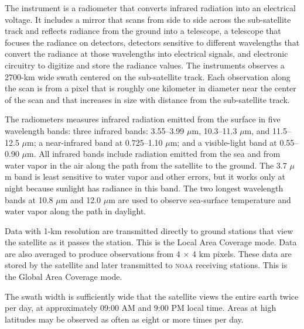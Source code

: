 The instrument is a radiometer that converts infrared radiation into
an electrical voltage. It includes a mirror that scans from side to
side across the sub-satellite track and reflects radiance from the
ground into a telescope, a telescope that focuses the radiance on
detectors, detectors sensitive to different wavelengths that convert
the radiance at those wavelengths into electrical signals, and
electronic circuitry to digitize and store the radiance values. The
instruments observes a 2700-km wide swath centered on the
sub-satellite track. Each observation along the scan is from a pixel
that is roughly one kilometer in diameter near the center of the scan
and that increases in size with distance from the sub-satellite track.

The radiometers measures infrared radiation emitted from the surface
in five wavelength bands: three infrared bands: 3.55--3.99 $\mu$m,
10.3--11.3 $\mu$m, and 11.5--12.5 $\mu$m; a near-infrared band at
0.725--1.10 $\mu$m; and a visible-light band at 0.55--0.90 $\mu$m. All
infrared bands include radiation emitted from the sea and from water
vapor in the air along the path from the satellite to the ground.  The
3.7 $\mu$m band is least sensitive to water vapor and other errors,
but it works only at night because sunlight has radiance in this
band. The two longest wavelength bands at 10.8 $\mu$m and 12.0 $\mu$m
are used to observe sea-surface temperature and water vapor along the
path in daylight.

Data with 1-km resolution are transmitted directly to ground stations
that view the satellite as it passes the station. This is the Local
Area Coverage mode. Data are also averaged to produce observations
from 4 $\times$ 4 km pixels. These data are stored by the satellite
and later transmitted to \textsc{noaa} receiving stations. This is the
Global Area Coverage mode.

The swath width is sufficiently wide that the satellite views the
entire earth twice per day, at approximately 09:00 AM and 9:00 PM
local time. Areas at high latitudes may be observed as often as eight
or more times per day.

